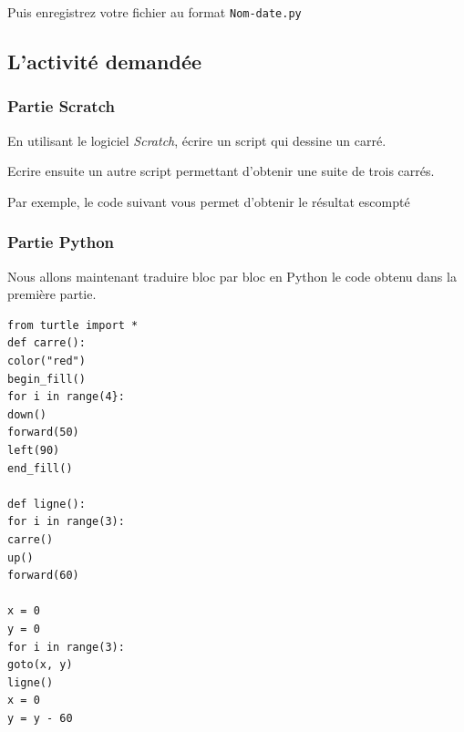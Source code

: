 Puis enregistrez votre fichier au format \texttt{Nom-date.py}

\subsection{L'activité demandée}



\subsubsection{Partie Scratch}

En utilisant le logiciel \emph{Scratch}, écrire un script qui dessine un carré.


Ecrire ensuite un autre script permettant d'obtenir une suite de trois carrés. 


Par exemple, le code suivant vous permet d'obtenir le résultat escompté


\subsubsection{Partie Python}

Nous allons maintenant traduire bloc par bloc en Python le code obtenu dans la première partie.

\begin{verbatim}
from turtle import *
def carre():
color("red")
begin_fill()
for i in range(4}:
down()
forward(50)
left(90)
end_fill()

def ligne():
for i in range(3):
carre()
up()
forward(60)

x = 0
y = 0
for i in range(3):
goto(x, y)
ligne()
x = 0
y = y - 60
\end{verbatim}